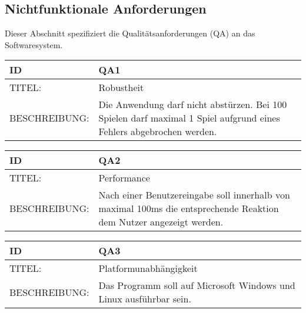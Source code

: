 \documentclass{uulm-assignment}
\begin{document}
\subsection{Nichtfunktionale Anforderungen}

Dieser Abschnitt spezifiziert die Qualitätsanforderungen (QA) an das Softwaresystem.

\begin{tabularx}{16cm}{l|X}
\textbf{ID} & \textbf{QA1} \\
\hline
TITEL: & Robustheit \\
\hline
BESCHREIBUNG: & Die Anwendung darf nicht abstürzen. Bei 100 Spielen darf maximal 1 Spiel
aufgrund eines Fehlers abgebrochen werden. \\
\end{tabularx}

\begin{tabularx}{16cm}{l|X}
\textbf{ID} & \textbf{QA2} \\
\hline
TITEL: & Performance \\
\hline
BESCHREIBUNG: & Nach einer Benutzereingabe soll innerhalb von maximal 100ms die entsprechende Reaktion dem Nutzer angezeigt werden.
\\
\end{tabularx}

\begin{tabularx}{16cm}{l|X}
\textbf{ID} & \textbf{QA3} \\
\hline
TITEL: & Platformunabhängigkeit \\
\hline
BESCHREIBUNG: & Das Programm soll auf Microsoft Windows und Linux ausführbar sein.
\\
\end{tabularx}
\end{document}
